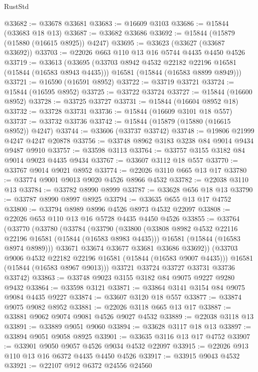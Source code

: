 \begin{lexlean}{RustStd}
\begin{coremodule}
@33682 := @33678 @33681
@33683 := @16609 @3103
@33686 := @15844 (@33683 @18 @13)
@33687 := @33682 @33686
@33692 := @15844 (@15879 (@15880 (@16615 @8925)) @4247)
@33695 := @33623 (@33627 (@33687 @33692))
@33703 := @22026 @663 @110 @13 @16 @5744 @4435 @4450 @4526
@33719 := @33613
    (@33695
      (@33703 @8942 @4532 @22182 @22196 @16581 (@15844 (@16583 @8943 @4435)))
      @16581
      (@15844 (@16583 @8899 @8949)))
@33721 := @16590 (@16591 @8952)
@33722 := @33719 @33721
@33724 := @15844 (@16595 @8952)
@33725 := @33722 @33724
@33727 := @15844 (@16600 @8952)
@33728 := @33725 @33727
@33731 := @15844 (@16604 @8952 @18)
@33732 := @33728 @33731
@33736 := @15844 (@16609 @3101 @18 @557)
@33737 := @33732 @33736
@33742 := @15844 (@15879 (@15880 (@16615 @8952)) @4247)
@33744 := @33606 (@33737 @33742)
@33748 := @19806 @21999 @4247 @4247 @20878
@33756 := @33748 @8962 @3183 @3238 @84 @9014 @9434 @9487 @9910
@33757 := @33598 @3113
@33764 := @33757 @3155 @3182 @84 @9014 @9023 @4435 @9434
@33767 := @33607 @3112 @18 @557
@33770 := @33767 @9014 @9021 @8952
@33774 := @22026 @3110 @665 @13 @17
@33780 := @33774 @9001 @9013 @9020 @4526 @8966 @4532
@33782 := @22038 @3110 @13
@33784 := @33782 @8990 @8999
@33787 := @33628 @656 @18 @13
@33790 := @33787 @8990 @8997 @8925
@33794 := @33635 @655 @13 @17 @4752
@33800 := @33794 @8989 @8996 @4526 @8973 @4532 @22097
@33808 := @22026 @653 @110 @13 @16 @5728 @4435 @4450 @4526
@33855 := @33764
    (@33770
      (@33780
        (@33784
          (@33790
            (@33800
              (@33808 @8982 @4532 @22116 @22196 @16581 (@15844 (@16583 @8983 @4435)))
              @16581
              (@15844 (@16583 @8974 @8989)))
            @33671
            @33674
            @33677
            @33681
            @33686
            @33692))
        (@33703 @9006 @4532 @22182 @22196 @16581 (@15844 (@16583 @9007 @4435)))
        @16581
        (@15844 (@16583 @8967 @9013)))
      @33721
      @33724
      @33727
      @33731
      @33736
      @33742)
@33863 := @33748 @9023 @3155 @3182 @84 @9075 @9227 @9280 @9432
@33864 := @33598 @3121
@33871 := @33864 @3141 @3154 @84 @9075 @9084 @4435 @9227
@33874 := @33607 @3120 @18 @557
@33877 := @33874 @9075 @9082 @8952
@33881 := @22026 @3118 @665 @13 @17
@33887 := @33881 @9062 @9074 @9081 @4526 @9027 @4532
@33889 := @22038 @3118 @13
@33891 := @33889 @9051 @9060
@33894 := @33628 @3117 @18 @13
@33897 := @33894 @9051 @9058 @8925
@33901 := @33635 @3116 @13 @17 @4752
@33907 := @33901 @9050 @9057 @4526 @9034 @4532 @22097
@33915 := @22026 @913 @110 @13 @16 @6372 @4435 @4450 @4526
@33917 := @33915 @9043 @4532
@33921 := @22107 @912 @6372 @24556 @24560

\end{coremodule}
\end{lexlean}
